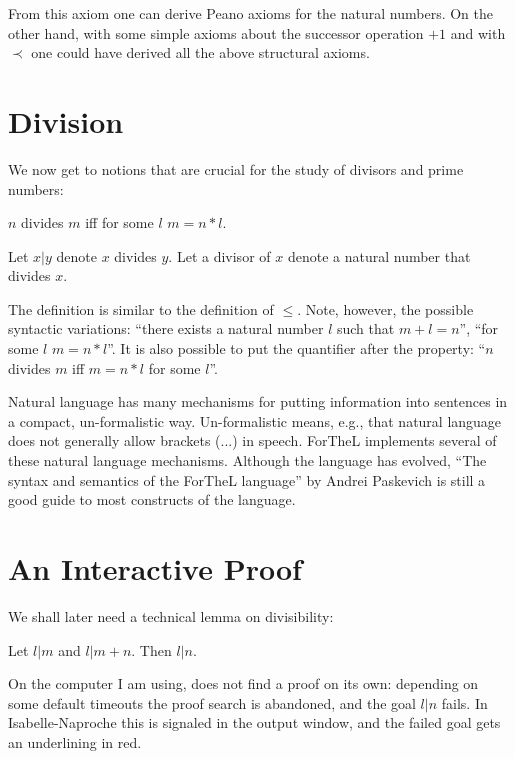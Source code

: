 \documentclass[11pt]{article}
\begin{document}
From this axiom one can derive Peano axioms for the 
natural numbers. On the other hand, with some simple
axioms about the successor operation $+1$ and with $\prec$
one could have derived all the above structural axioms.

\section{Division}

We now get to notions that are crucial for the
study of divisors and prime numbers: 

\begin{forthel}

\begin{definition}
  $n$ divides $m$ iff for some $l$ $m = n * l$.
\end{definition}

Let $x | y$ denote $x$ divides $y$.
Let a divisor of $x$ denote a natural number 
that divides $x$.
\end{forthel}

The definition is similar to the definition of $\leq$.
Note, however, the possible syntactic variations:
``there exists a natural number $l$ such that  
$m + l = n$'', ``for some $l$ $m = n * l$''. It is also possible
to put the quantifier after the property:
``$n$ divides $m$ iff $m = n * l$ for some $l$''.

Natural language has many mechanisms for putting
information into sentences in a compact, un-formalistic way.
Un-formalistic means, e.g., that natural language
does not generally allow brackets (...) in speech. ForTheL 
implements several of these natural language mechanisms.
Although the language has evolved, 
``The syntax and semantics of the ForTheL language'' by Andrei
Paskevich is still a good guide to most constructs of the
language.

\section{An Interactive Proof}

We shall later need a technical lemma on divisibility:

\begin{lemma} Let $l | m$ and $l | m + n$. Then $l | n$.
\end{lemma}

On the computer I am using, \Naproche{} does not find
a proof on its own: depending on some default timeouts the
proof search is abandoned, and the goal $l | n$ fails.
In Isabelle-Naproche this is signaled in the output
window, and the failed goal gets an underlining in red.
\end{document}
